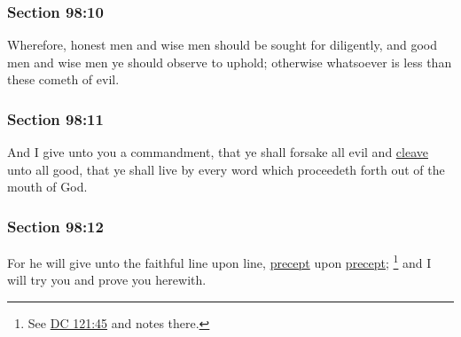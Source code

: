 	\subsubsection{Section 98:10} %
		\label{DC98-10}

		Wherefore, honest men and wise men should be sought for diligently, and good men and wise men ye should observe to uphold; otherwise whatsoever is less than these cometh of evil.


	\subsubsection{Section 98:11} %
		\label{DC98-11}

		And I give unto you a commandment, that ye shall forsake all evil and \hyperref[CLEAVE]{cleave} unto all good, that ye shall live by every word which proceedeth forth out of the mouth of God.


	\subsubsection{Section 98:12} %
		\label{DC98-12}

		For he will give unto the faithful line upon line, \hyperref[PRECEPT]{precept} upon \hyperref[PRECEPT]{precept};%
		\footnote{%
			See \hyperref[DC121-45]{DC 121:45} and notes there.
			} 
		and I will try you and prove you herewith.


